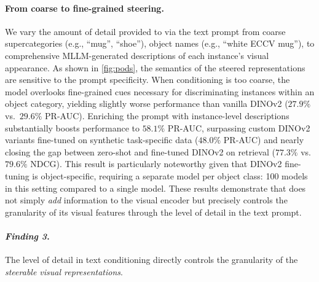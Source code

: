 \paragraph{From coarse to fine-grained steering.}

We vary the amount of detail provided to \model{} via the text prompt from coarse supercategories (e.g., ``mug'', ``shoe''), object names (e.g., ``white ECCV mug''),
to comprehensive MLLM-generated descriptions of each instance's visual appearance. 
As shown in \cref{fig:pods}, the semantics of the steered representations are sensitive to the prompt specificity.
When conditioning is too coarse, the model overlooks fine-grained cues necessary for discriminating instances within an object category, yielding slightly worse performance than vanilla DINOv2 ($27.9\%$ vs.\ $29.6\%$ PR-AUC). Enriching the prompt with instance-level descriptions substantially boosts performance to $58.1\%$ PR-AUC, surpassing custom DINOv2 variants fine-tuned on synthetic task-specific data ($48.0\%$ PR-AUC) and nearly closing the gap 
between zero-shot and fine-tuned DINOv2 on 
retrieval ($77.3\%$ vs. $79.6\%$ NDCG).
This result is particularly noteworthy given that DINOv2 fine-tuning is object-specific, requiring a separate model per object class: 100 models in this setting compared to a single \model{} model.
These results demonstrate that \model{} does not simply \textit{add} information to the visual encoder but precisely controls the granularity of its visual features through the level of detail in the text prompt.

\iffindingbox
\begin{tcolorbox}[colback=\findingcolor,
colframe=black, arc=4pt, boxsep=1pt]
\paragraph{\textbf{\textit{Finding 3}.}}
The level of detail in text conditioning directly controls the granularity of the \textit{steerable visual representations}.
\end{tcolorbox}
\fi

